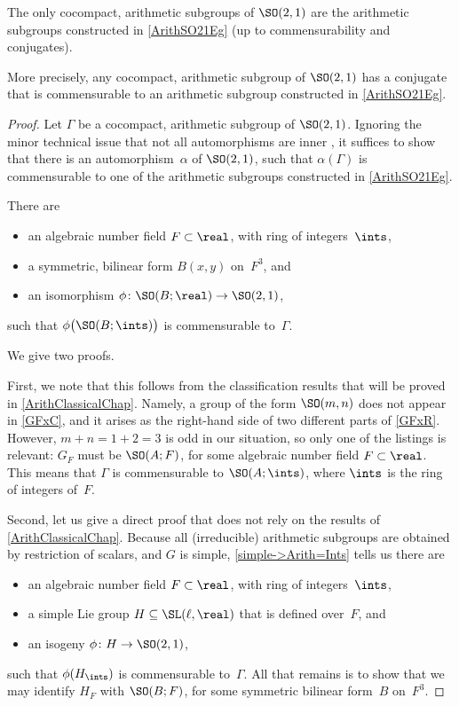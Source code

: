 \begin{prop} \label{CocpctArithSO21}
 The only cocompact, arithmetic subgroups of\/ $\SO(2,1)$ are the 
arithmetic subgroups constructed in \cref{ArithSO21Eg}
\textup(up to commensurability and conjugates\textup).

More precisely, any cocompact, arithmetic subgroup of\/
$\SO(2,1)$ has a conjugate that is commensurable
to an arithmetic subgroup constructed in \cref{ArithSO21Eg}.
 \end{prop} 

\begin{proof}
Let $\Gamma$ be a cocompact, arithmetic subgroup of
$\SO(2,1)$. Ignoring the minor technical issue that not all
automorphisms are inner ,
it suffices to
show that there is an automorphism~$\alpha$ of $\SO(2,1)$,
such that $\alpha(\Gamma)$ is commensurable to one of the
arithmetic subgroups constructed in \cref{ArithSO21Eg}.
 
\setcounter{step}{0}

\begin{step} \label{CocpctArithSO21Pf-isog}
 There are 
  \begin{itemize}
 \item an algebraic number field $F \subset \real$, with
ring of integers~$\ints$,
 \item a symmetric, bilinear form $B(x,y)$ on~$F^3$, and
 \item an isomorphism $\phi \colon \SO(B;\real) \to
\SO(2,1)$,
 \end{itemize}
 such that $\phi \bigl( \SO(B;\ints) \bigr)$ is
commensurable to~$\Gamma$. 
 \end{step}
 We give two proofs.

 First, we note that this follows from the classification results that will be proved in \cref{ArithClassicalChap}. Namely, a group of the form $\SO(m,n)$ does not appear in \cref{GFxC}, and it arises as the right-hand side of two different parts of \cref{GFxR}. However, $m+n = 1+2 = 3$ is odd in our situation, so only one of the listings is
relevant: $G_F$ must be $\SO(A;F)$, for some
algebraic number field $F \subset \real$. This means that
$\Gamma$ is commensurable to $\SO(A;\ints)$, where $\ints$ is the 
ring of integers of~$F$.

Second, let us give a direct proof that does not rely on
the results of \cref{ArithClassicalChap}. Because all
(irreducible) arithmetic subgroups are obtained by
restriction of scalars, and $G$ is simple, \cref{simple->Arith=Ints} tells us
there are
 \begin{itemize}
 \item an algebraic number field $F \subset \real$, with
ring of integers~$\ints$,
 \item a simple Lie group $H \subseteq \SL(\ell,\real)$ that
is defined over~$F$, and
 \item an isogeny $\phi \colon H \to \SO(2,1)$,
 \end{itemize}
 such that $\phi(H_{\ints})$ is commensurable
to~$\Gamma$. All that remains is to show that we may
identify $H_F$ with $\SO(B;F)$, for some symmetric bilinear
form~$B$ on~$F^3$.


\end{proof}
